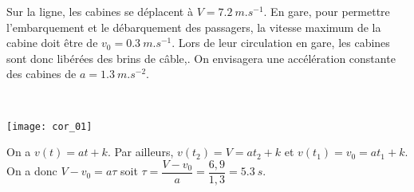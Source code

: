 \begin{multicols}{2}
Sur la ligne, les cabines se déplacent à $V = \SI{7,2}{m.s^{-1}}$. En gare, pour permettre l’embarquement et le
débarquement des passagers, la vitesse maximum de la cabine doit être de $v_0 = \SI{0.3}{m.s^{-1}}$.
Lors de leur circulation en gare, les cabines sont donc libérées des brins de câble,.%
On envisagera une accélération constante des cabines de $a=\SI{1.3}{m.s^{-2}}$.
\fi
{}
\ifprof\begin{corrige} ~\\

\begin{minipage}[c]{.4\linewidth}
\begin{center}
\texttt{[image: cor\_01]}
\end{center}
\end{minipage} \hfill
\begin{minipage}[c]{.5\linewidth}

On a $v(t)=at+k$. Par ailleurs, $v(t_2)=V=at_2+k$ et $v(t_1)=v_0=at_1+k$. On a donc $V-v_0 =  a\tau $ soit $\tau = \dfrac{V-v_0}{a} = \dfrac{6,9}{1,3} =\SI{5,3}{s}$.



\end{minipage}
\end{corrige}
\end{multicols}
